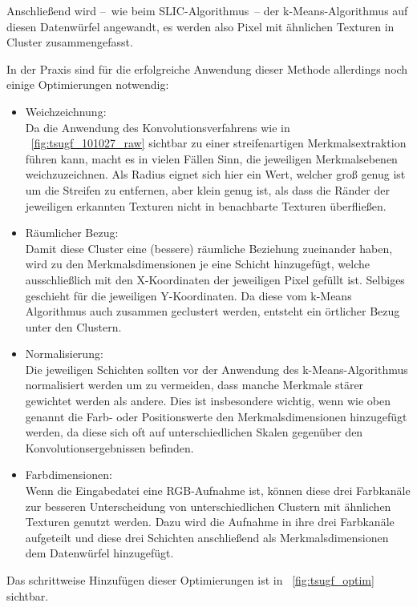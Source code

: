 Anschließend wird --~wie beim SLIC-Algorithmus~-- der k-Means-Algorithmus auf diesen Datenwürfel angewandt, es werden also Pixel mit ähnlichen Texturen in Cluster zusammengefasst.

In der Praxis sind für die erfolgreiche Anwendung dieser Methode allerdings noch einige Optimierungen notwendig: \cite{mathworks_15}

\begin{itemize}
	\item Weichzeichnung:\\
	Da die Anwendung des Konvolutionsverfahrens wie in \figurename~\ref{fig:tsugf_101027_raw} sichtbar zu einer streifenartigen Merkmalsextraktion führen kann, macht es in vielen Fällen Sinn, die jeweiligen Merkmalsebenen weichzuzeichnen. Als Radius eignet sich hier ein Wert, welcher groß genug ist um die Streifen zu entfernen, aber klein genug ist, als dass die Ränder der jeweiligen erkannten Texturen nicht in benachbarte Texturen überfließen.
	\item Räumlicher Bezug:\\
	Damit diese Cluster eine (bessere) räumliche Beziehung zueinander haben, wird zu den Merkmalsdimensionen je eine Schicht hinzugefügt, welche ausschließlich mit den X-Koordinaten der jeweiligen Pixel gefüllt ist. Selbiges geschieht für die jeweiligen Y-Koordinaten. Da diese vom k-Means Algorithmus auch zusammen geclustert werden, entsteht ein örtlicher Bezug unter den Clustern.
	\item Normalisierung:\\
	Die jeweiligen Schichten sollten vor der Anwendung des k-Means-Algorithmus normalisiert werden um zu vermeiden, dass manche Merkmale stärer gewichtet werden als andere. Dies ist insbesondere wichtig, wenn wie oben genannt die Farb- oder Positionswerte den Merkmalsdimensionen hinzugefügt werden, da diese sich oft auf unterschiedlichen Skalen gegenüber den Konvolutionsergebnissen befinden.
	\item Farbdimensionen:\\
	Wenn die Eingabedatei eine RGB-Aufnahme ist, können diese drei Farbkanäle zur besseren Unterscheidung von unterschiedlichen Clustern mit ähnlichen Texturen genutzt werden. Dazu wird die Aufnahme in ihre drei Farbkanäle aufgeteilt und diese drei Schichten anschließend als Merkmalsdimensionen dem Datenwürfel hinzugefügt.
\end{itemize}

Das schrittweise Hinzufügen dieser Optimierungen ist in \figurename~\ref{fig:tsugf_optim} sichtbar.

